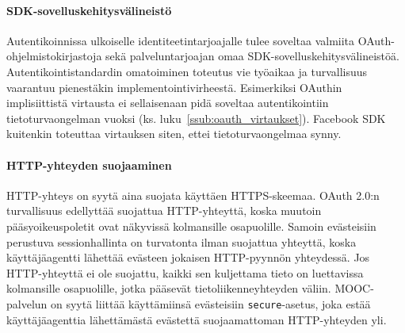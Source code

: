\documentclass[finnish,gradu]{tktltiki}
\begin{document}
  \paragraph{SDK-sovelluskehitysvälineistö} \hfill %
  \label{par:sdk_sovelluskehitysvälineistö}

  Autentikoinnissa ulkoiselle identiteetintarjoajalle tulee soveltaa valmiita OAuth-ohjelmistokirjastoja sekä palveluntarjoajan omaa SDK-sovelluskehitysvälineistöä. Autentikointistandardin omatoiminen toteutus vie työaikaa ja turvallisuus vaarantuu pienestäkin implementointivirheestä. Esimerkiksi OAuthin implisiittistä virtausta ei sellaisenaan pidä soveltaa autentikointiin tietoturvaongelman vuoksi (ks. luku~\ref{ssub:oauth_virtaukset}). Facebook SDK kuitenkin toteuttaa virtauksen siten, ettei tietoturvaongelmaa synny.


  \paragraph{HTTP-yhteyden suojaaminen} \hfill %
  \label{par:http_yhteyden_suojaaminen}

  HTTP-yhteys on syytä aina suojata käyttäen HTTPS-skeemaa. OAuth 2.0:n turvallisuus edellyttää suojattua HTTP-yhteyttä, koska muutoin pääsyoikeuspoletit ovat näkyvissä kolmansille osapuolille. Samoin evästeisiin perustuva sessionhallinta on turvatonta ilman suojattua yhteyttä, koska käyttäjäagentti lähettää evästeen jokaisen HTTP-pyynnön yhteydessä. Jos HTTP-yhteyttä ei ole suojattu, kaikki sen kuljettama tieto on luettavissa kolmansille osapuolille, jotka pääsevät tietoliikenneyhteyden väliin. MOOC-palvelun on syytä liittää käyttämiinsä evästeisiin \verb!secure!-asetus, joka estää käyttäjäagenttia lähettämästä evästettä suojaamattoman HTTP-yhteyden yli.





\end{document}
